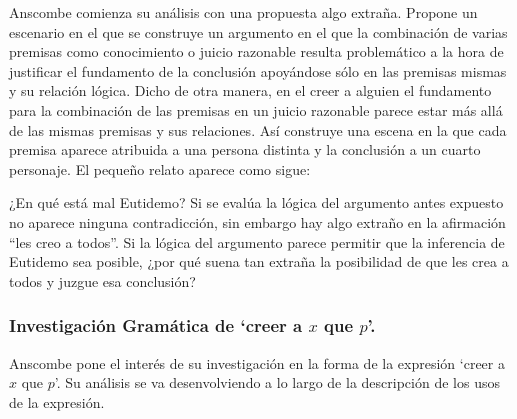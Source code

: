 Anscombe comienza su análisis con una propuesta algo extraña. Propone un escenario en el que se construye un argumento en el que la combinación de varias premisas como conocimiento o juicio razonable resulta problemático a la hora de justificar el fundamento de la conclusión apoyándose sólo en las premisas mismas y su relación lógica. Dicho de otra manera, en el creer a alguien el fundamento para la combinación de las premisas en un juicio razonable parece estar más allá de las mismas premisas y sus relaciones. Así construye una escena en la que cada premisa aparece atribuida a una persona distinta y la conclusión a un cuarto personaje. El pequeño relato aparece como sigue: 

¿En qué está mal Eutidemo? Si se evalúa la lógica del argumento antes expuesto
no aparece ninguna contradicción, sin embargo hay algo extraño en la afirmación
``les creo a todos''. Si la lógica del argumento parece permitir que la
inferencia de Eutidemo sea posible, ¿por qué suena tan extraña la posibilidad de
que les crea a todos y juzgue esa conclusión?

\subsubsection{Investigación Gramática de `creer a $x$ que $p$'.}
Anscombe pone el interés de su investigación en la forma de la expresión `creer a $x$ que $p$'\autocite[Cf.~][2]{anscombe2008faith:tobelieve}. Su análisis se va desenvolviendo a lo largo de la descripción de los usos de la expresión.

